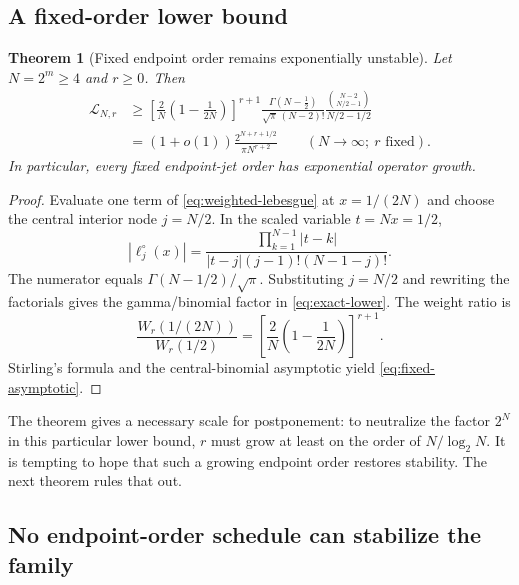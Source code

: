 \documentclass[11pt,oneside]{article}
\newtheorem{theorem}{Theorem}[section]
\theoremstyle{definition}
\theoremstyle{remark}
\newcommand{\abs}[1]{\left\lvert #1\right\rvert}
\begin{document}
\subsection{A fixed-order lower bound}

\begin{theorem}[Fixed endpoint order remains exponentially unstable]
\label{thm:fixed-r-lower}
Let $N=2^m\ge4$ and $r\ge0$.  Then
\begin{align}
 \mathscr L_{N,r}
 &\ge
 \left[\frac{2}{N}\left(1-\frac{1}{2N}\right)\right]^{r+1}
 \frac{\Gamma(N-\tfrac12)}{\sqrt\pi\,(N-2)!}
 \frac{\binom{N-2}{N/2-1}}{N/2-1/2}\label{eq:exact-lower}\\
 &=(1+o(1))\frac{2^{N+r+1/2}}{\pi N^{r+2}}
 \qquad(N\to\infty;\ r\text{ fixed}).\label{eq:fixed-asymptotic}
\end{align}
In particular, every fixed endpoint-jet order has exponential operator growth.
\end{theorem}

\begin{proof}
Evaluate one term of \eqref{eq:weighted-lebesgue} at $x=1/(2N)$ and choose the central interior node $j=N/2$.  In the scaled variable $t=Nx=1/2$,
\begin{equation}
 \abs{\ell_j^{\circ}(x)}=
 \frac{\prod_{k=1}^{N-1}\abs{t-k}}
 {\abs{t-j}(j-1)!(N-1-j)!}.
 \label{eq:cardinal-product}
\end{equation}
The numerator equals $\Gamma(N-1/2)/\sqrt\pi$.  Substituting $j=N/2$ and rewriting the factorials gives the gamma/binomial factor in \eqref{eq:exact-lower}.  The weight ratio is
\begin{equation}
 \frac{W_r(1/(2N))}{W_r(1/2)}
 =\left[\frac{2}{N}\left(1-\frac{1}{2N}\right)\right]^{r+1}.
\end{equation}
Stirling's formula and the central-binomial asymptotic yield \eqref{eq:fixed-asymptotic}.
\end{proof}

The theorem gives a necessary scale for postponement: to neutralize the factor $2^N$ in this particular lower bound, $r$ must grow at least on the order of $N/\log_2N$.  It is tempting to hope that such a growing endpoint order restores stability.  The next theorem rules that out.

\subsection{No endpoint-order schedule can stabilize the family}
\end{document}
